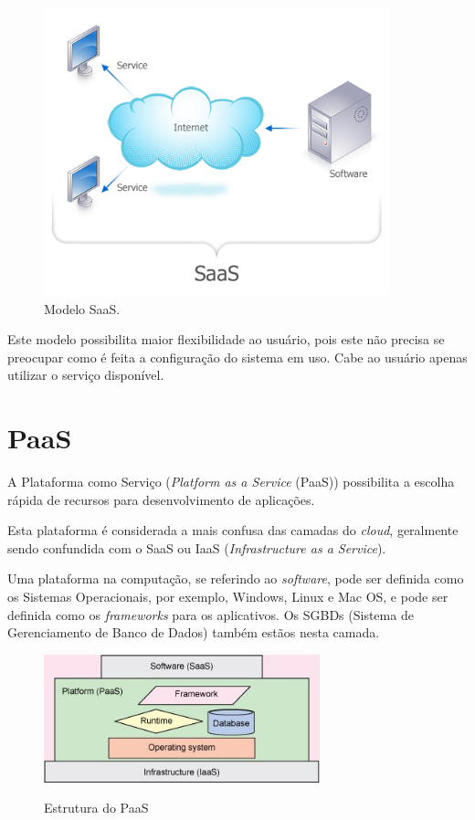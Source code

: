 \documentclass{abnt}
\begin{document}
	\begin{figure}[h]
		\centering
		\includegraphics[width=10cm, keepaspectratio]{img/SaaS.png}
		\caption{Modelo SaaS.}
		\label{saas}
	\end{figure}
	
	Este modelo possibilita maior flexibilidade ao usuário, pois este não 
	precisa se preocupar como é feita a configuração do sistema em uso. Cabe 
	ao usuário apenas utilizar o serviço disponível.

	\section{PaaS}
		A Plataforma como Serviço (\textit{Platform as a Service} (PaaS)) possibilita a escolha rápida de recursos para desenvolvimento de aplicações.
		
		Esta plataforma é considerada a mais confusa das camadas do \textit{cloud}, geralmente sendo confundida com o SaaS ou IaaS (\textit{Infrastructure as a Service}).
		
		Uma plataforma na computação, se referindo ao \textit{software}, pode ser definida como os Sistemas Operacionais, por exemplo, Windows\texttrademark , Linux e Mac OS, e pode ser definida como os \textit{frameworks} para os aplicativos. Os SGBDs (Sistema de Gerenciamento de Banco de Dados) também estãos nesta camada.

	\begin{figure}[h]
		\centering
		\includegraphics[width=8cm, keepaspectratio]{img/figure1.jpg}
		\label{fig_paas}
		\caption{Estrutura do PaaS}
	\end{figure}
\end{document}
